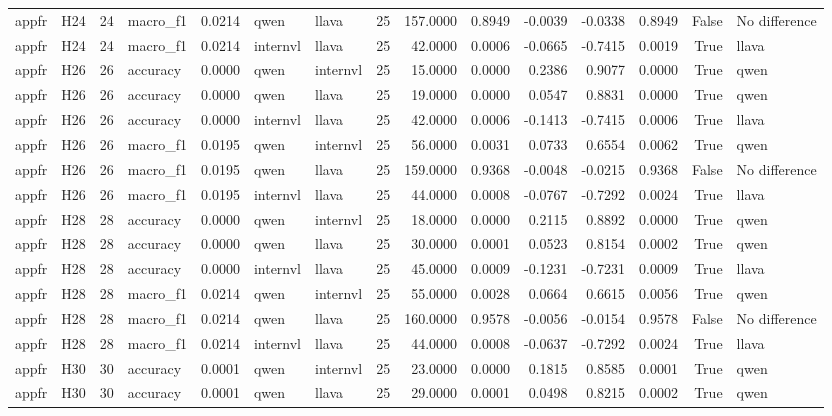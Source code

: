 \begin{table}[tbp]
\begin{tabular}{llrlrllrrrrrrrl}
appfr & H24 & 24 & macro\_f1 & 0.0214 & qwen & llava & 25 & 157.0000 & 0.8949 & -0.0039 & -0.0338 & 0.8949 & False & No difference \\
appfr & H24 & 24 & macro\_f1 & 0.0214 & internvl & llava & 25 & 42.0000 & 0.0006 & -0.0665 & -0.7415 & 0.0019 & True & llava \\
appfr & H26 & 26 & accuracy & 0.0000 & qwen & internvl & 25 & 15.0000 & 0.0000 & 0.2386 & 0.9077 & 0.0000 & True & qwen \\
appfr & H26 & 26 & accuracy & 0.0000 & qwen & llava & 25 & 19.0000 & 0.0000 & 0.0547 & 0.8831 & 0.0000 & True & qwen \\
appfr & H26 & 26 & accuracy & 0.0000 & internvl & llava & 25 & 42.0000 & 0.0006 & -0.1413 & -0.7415 & 0.0006 & True & llava \\
appfr & H26 & 26 & macro\_f1 & 0.0195 & qwen & internvl & 25 & 56.0000 & 0.0031 & 0.0733 & 0.6554 & 0.0062 & True & qwen \\
appfr & H26 & 26 & macro\_f1 & 0.0195 & qwen & llava & 25 & 159.0000 & 0.9368 & -0.0048 & -0.0215 & 0.9368 & False & No difference \\
appfr & H26 & 26 & macro\_f1 & 0.0195 & internvl & llava & 25 & 44.0000 & 0.0008 & -0.0767 & -0.7292 & 0.0024 & True & llava \\
appfr & H28 & 28 & accuracy & 0.0000 & qwen & internvl & 25 & 18.0000 & 0.0000 & 0.2115 & 0.8892 & 0.0000 & True & qwen \\
appfr & H28 & 28 & accuracy & 0.0000 & qwen & llava & 25 & 30.0000 & 0.0001 & 0.0523 & 0.8154 & 0.0002 & True & qwen \\
appfr & H28 & 28 & accuracy & 0.0000 & internvl & llava & 25 & 45.0000 & 0.0009 & -0.1231 & -0.7231 & 0.0009 & True & llava \\
appfr & H28 & 28 & macro\_f1 & 0.0214 & qwen & internvl & 25 & 55.0000 & 0.0028 & 0.0664 & 0.6615 & 0.0056 & True & qwen \\
appfr & H28 & 28 & macro\_f1 & 0.0214 & qwen & llava & 25 & 160.0000 & 0.9578 & -0.0056 & -0.0154 & 0.9578 & False & No difference \\
appfr & H28 & 28 & macro\_f1 & 0.0214 & internvl & llava & 25 & 44.0000 & 0.0008 & -0.0637 & -0.7292 & 0.0024 & True & llava \\
appfr & H30 & 30 & accuracy & 0.0001 & qwen & internvl & 25 & 23.0000 & 0.0000 & 0.1815 & 0.8585 & 0.0001 & True & qwen \\
appfr & H30 & 30 & accuracy & 0.0001 & qwen & llava & 25 & 29.0000 & 0.0001 & 0.0498 & 0.8215 & 0.0002 & True & qwen \\

\end{tabular}
\end{table}
